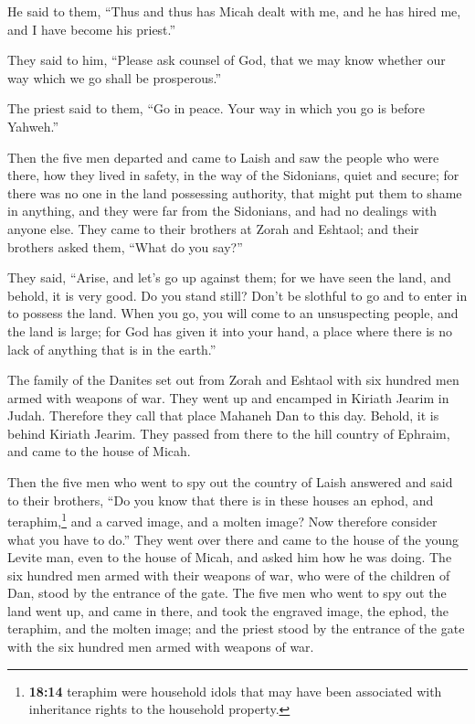  He said to them, ``Thus and thus has Micah dealt with me,
and he has hired me, and I have become his priest.''

 They said to him, ``Please ask counsel of God, that we
may know whether our way which we go shall be prosperous.''

 The priest said to them, ``Go in peace. Your way in which
you go is before Yahweh.''

 Then the five men departed and came to Laish and saw the
people who were there, how they lived in safety, in the way of the
Sidonians, quiet and secure; for there was no one in the land possessing
authority, that might put them to shame in anything, and they were far
from the Sidonians, and had no dealings with anyone else. 
They came to their brothers at Zorah and Eshtaol; and their brothers
asked them, ``What do you say?''

 They said, ``Arise, and let's go up against them; for we
have seen the land, and behold, it is very good. Do you stand still?
Don't be slothful to go and to enter in to possess the land.
 When you go, you will come to an unsuspecting people,
and the land is large; for God has given it into your hand, a place
where there is no lack of anything that is in the earth.''

 The family of the Danites set out from Zorah and Eshtaol
with six hundred men armed with weapons of war.  They
went up and encamped in Kiriath Jearim in Judah. Therefore they call
that place Mahaneh Dan to this day. Behold, it is behind Kiriath Jearim.
 They passed from there to the hill country of Ephraim,
and came to the house of Micah.

 Then the five men who went to spy out the country of
Laish answered and said to their brothers, ``Do you know that there is
in these houses an ephod, and teraphim,\footnote{\textbf{18:14} teraphim
  were household idols that may have been associated with inheritance
  rights to the household property.} and a carved image, and a molten
image? Now therefore consider what you have to do.'' 
They went over there and came to the house of the young Levite man, even
to the house of Micah, and asked him how he was doing. 
The six hundred men armed with their weapons of war, who were of the
children of Dan, stood by the entrance of the gate.  The
five men who went to spy out the land went up, and came in there, and
took the engraved image, the ephod, the teraphim, and the molten image;
and the priest stood by the entrance of the gate with the six hundred
men armed with weapons of war.

